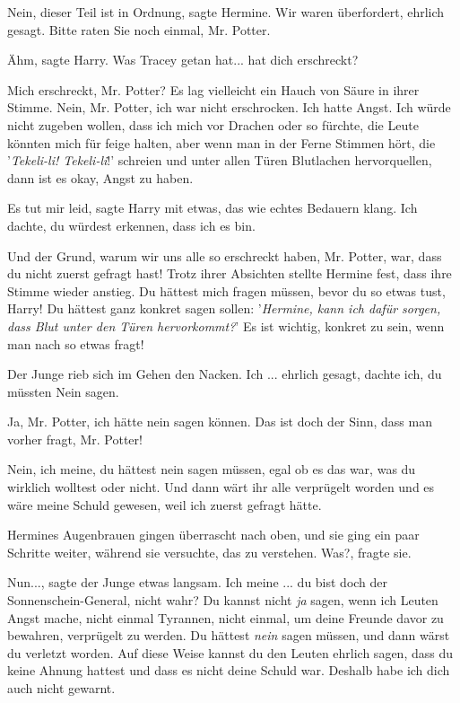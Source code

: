 \glqq Nein, dieser Teil ist in Ordnung\grqq{}, sagte Hermine. \glqq Wir waren
überfordert, ehrlich gesagt. Bitte raten Sie noch einmal, Mr. Potter.\grqq{}

\glqq Ähm\grqq{}, sagte Harry. \glqq Was Tracey getan hat... hat dich
erschreckt?\grqq{}

\glqq Mich erschreckt, Mr. Potter?\grqq{} Es lag vielleicht ein Hauch von Säure
in ihrer Stimme. \glqq Nein, Mr. Potter, ich war nicht erschrocken. Ich hatte
Angst. Ich würde nicht zugeben wollen, dass ich mich vor Drachen oder so
fürchte, die Leute könnten mich für feige halten, aber wenn man in der Ferne
Stimmen hört, die '\emph{Tekeli-li! Tekeli-li}!' schreien und unter allen Türen
Blutlachen hervorquellen, dann ist es okay, Angst zu haben.\grqq{}

\glqq Es tut mir leid\grqq{}, sagte Harry mit etwas, das wie echtes Bedauern
klang. \glqq Ich dachte, du würdest erkennen, dass ich es bin.\grqq{}

\glqq Und der Grund, warum wir uns alle so erschreckt haben, Mr. Potter, war,
dass du nicht zuerst gefragt hast!\grqq{} Trotz ihrer Absichten stellte Hermine
fest, dass ihre Stimme wieder anstieg. \glqq Du hättest mich fragen müssen,
bevor du so etwas tust, Harry! Du hättest ganz konkret sagen sollen:
'\emph{Hermine, kann ich dafür sorgen, dass Blut unter den Türen hervorkommt?}'
Es ist wichtig, konkret zu sein, wenn man nach so etwas fragt!\grqq{}

Der Junge rieb sich im Gehen den Nacken. \glqq Ich ... ehrlich gesagt, dachte
ich, du müssten Nein sagen.\grqq{}

\glqq Ja, Mr. Potter, ich hätte nein sagen können. Das ist doch der Sinn, dass
man vorher fragt, Mr. Potter!\grqq{}

\glqq Nein, ich meine, du hättest nein sagen müssen, egal ob es das war, was du
wirklich wolltest oder nicht. Und dann wärt ihr alle verprügelt worden und es
wäre meine Schuld gewesen, weil ich zuerst gefragt hätte.\grqq{}

Hermines Augenbrauen gingen überrascht nach oben, und sie ging ein paar Schritte
weiter, während sie versuchte, das zu verstehen. \glqq Was?\grqq{}, fragte sie.

\glqq Nun...\grqq{}, sagte der Junge etwas langsam. \glqq Ich meine ... du bist
doch der Sonnenschein-General, nicht wahr? Du kannst nicht \emph{ja} sagen, wenn
ich Leuten Angst mache, nicht einmal Tyrannen, nicht einmal, um deine Freunde
davor zu bewahren, verprügelt zu werden. Du hättest \emph{nein} sagen müssen,
und dann wärst du verletzt worden. Auf diese Weise kannst du den Leuten ehrlich
sagen, dass du keine Ahnung hattest und dass es nicht deine Schuld war. Deshalb
habe ich dich auch nicht gewarnt.\grqq{}

